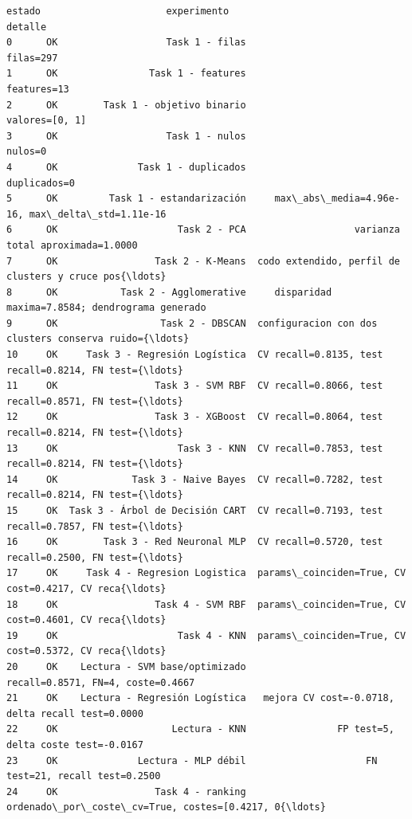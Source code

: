 \documentclass[11pt]{article}
\begin{document}
    
    \begin{Verbatim}[commandchars=\\\{\}]
   estado                      experimento                                            detalle
0      OK                   Task 1 - filas                                          filas=297
1      OK                Task 1 - features                                        features=13
2      OK        Task 1 - objetivo binario                                     valores=[0, 1]
3      OK                   Task 1 - nulos                                            nulos=0
4      OK              Task 1 - duplicados                                       duplicados=0
5      OK         Task 1 - estandarización     max\_abs\_media=4.96e-16, max\_delta\_std=1.11e-16
6      OK                     Task 2 - PCA                   varianza total aproximada=1.0000
7      OK                 Task 2 - K-Means  codo extendido, perfil de clusters y cruce pos{\ldots}
8      OK           Task 2 - Agglomerative     disparidad maxima=7.8584; dendrograma generado
9      OK                  Task 2 - DBSCAN  configuracion con dos clusters conserva ruido={\ldots}
10     OK     Task 3 - Regresión Logística  CV recall=0.8135, test recall=0.8214, FN test={\ldots}
11     OK                 Task 3 - SVM RBF  CV recall=0.8066, test recall=0.8571, FN test={\ldots}
12     OK                 Task 3 - XGBoost  CV recall=0.8064, test recall=0.8214, FN test={\ldots}
13     OK                     Task 3 - KNN  CV recall=0.7853, test recall=0.8214, FN test={\ldots}
14     OK             Task 3 - Naive Bayes  CV recall=0.7282, test recall=0.8214, FN test={\ldots}
15     OK  Task 3 - Árbol de Decisión CART  CV recall=0.7193, test recall=0.7857, FN test={\ldots}
16     OK        Task 3 - Red Neuronal MLP  CV recall=0.5720, test recall=0.2500, FN test={\ldots}
17     OK     Task 4 - Regresion Logistica  params\_coinciden=True, CV cost=0.4217, CV reca{\ldots}
18     OK                 Task 4 - SVM RBF  params\_coinciden=True, CV cost=0.4601, CV reca{\ldots}
19     OK                     Task 4 - KNN  params\_coinciden=True, CV cost=0.5372, CV reca{\ldots}
20     OK    Lectura - SVM base/optimizado                  recall=0.8571, FN=4, coste=0.4667
21     OK    Lectura - Regresión Logística   mejora CV cost=-0.0718, delta recall test=0.0000
22     OK                    Lectura - KNN                FP test=5, delta coste test=-0.0167
23     OK              Lectura - MLP débil                     FN test=21, recall test=0.2500
24     OK                 Task 4 - ranking  ordenado\_por\_coste\_cv=True, costes=[0.4217, 0{\ldots}
    \end{Verbatim}
\end{document}
